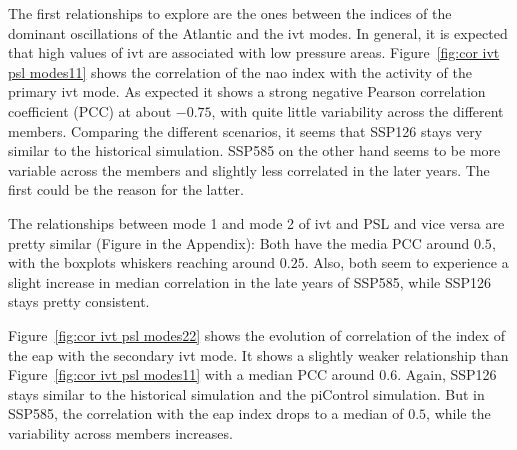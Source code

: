 The first relationships to explore are the ones between the indices of the dominant oscillations of the Atlantic and the \ac{ivt} modes. 
In general, it is expected that high values of \ac{ivt} are associated with low pressure areas.
Figure~\ref{fig:cor ivt psl modes11} shows the correlation of the \ac{nao} index with the activity of the primary \ac{ivt} mode. 
As expected it shows a strong negative Pearson correlation coefficient (PCC) at about $-0.75$, with quite little variability across the different members. 
Comparing the different scenarios, it seems that SSP126 stays very similar to the historical simulation. 
SSP585 on the other hand seems to be more variable across the members and slightly less correlated in the later years. The first could be the reason for the latter. 

%

The relationships between mode 1 and mode 2 of \ac{ivt} and PSL and vice versa are pretty similar (Figure in the Appendix): 
Both have the media PCC around $0.5$, with the boxplots whiskers reaching around $0.25$. 
Also, both seem to experience a slight increase in median correlation in the late years of SSP585, while SSP126 stays pretty consistent. 




%
%

Figure~\ref{fig:cor ivt psl modes22} shows the evolution of correlation of the index of the \ac{eap} with the secondary \ac{ivt} mode. 
It shows a slightly weaker relationship than Figure~\ref{fig:cor ivt psl modes11} with a median PCC around $0.6$. 
Again, SSP126 stays similar to the historical simulation and the piControl simulation. 
But in SSP585, the correlation with the \ac{eap} index drops to a median of $0.5$, while the variability across members increases. 


